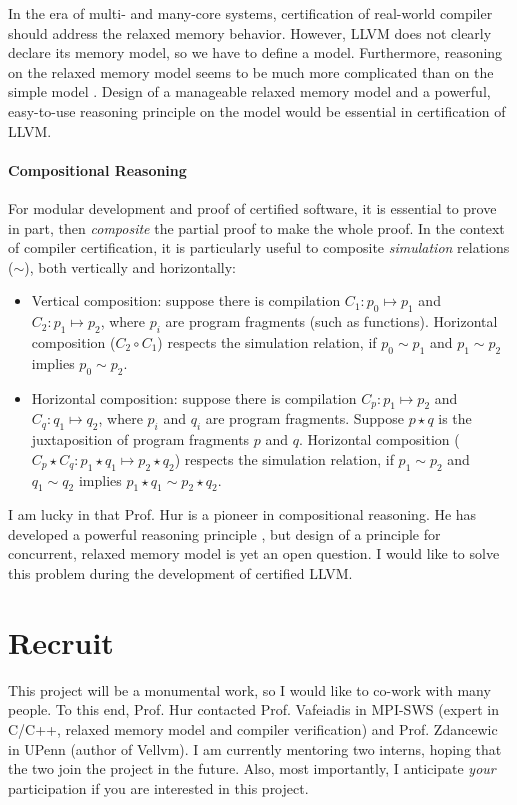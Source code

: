 \documentclass[nocopyrightspace]{sigplanconf}
\begin{document}
In the era of multi- and many-core systems, certification of
real-world compiler should address the relaxed memory behavior.
However, LLVM does not clearly declare its memory model, so we have to
define a model.  Furthermore, reasoning on the relaxed memory model
seems to be much more complicated than on the simple model
\cite{Aaron:GPS}.  Design of a manageable relaxed memory model and a
powerful, easy-to-use reasoning principle on the model would be
essential in certification of LLVM.

\paragraph{Compositional Reasoning}\label{sec:compose}

For modular development and proof of certified software, it is
essential to prove in part, then \emph{composite} the partial proof to
make the whole proof.  In the context of compiler certification, it is
particularly useful to composite \emph{simulation} relations ($\sim$),
both vertically and horizontally:
\begin{itemize}
\item Vertical composition: suppose there is compilation $C_1: p_0
  \mapsto p_1$ and $C_2: p_1 \mapsto p_2$, where $p_i$ are program
  fragments (such as functions).  Horizontal composition ($C_2 \circ
  C_1$) respects the simulation relation, if $p_0 \sim p_1$ and $p_1
  \sim p_2$ implies $p_0 \sim p_2$.
\item Horizontal composition: suppose there is compilation $C_p: p_1
  \mapsto p_2$ and $C_q: q_1 \mapsto q_2$, where $p_i$ and $q_i$ are
  program fragments.  Suppose $p \star q$ is the juxtaposition of
  program fragments $p$ and $q$.  Horizontal composition ($C_p \star
  C_q: p_1 \star q_1 \mapsto p_2 \star q_2$) respects the simulation
  relation, if $p_1 \sim p_2$ and $q_1 \sim q_2$ implies $p_1 \star
  q_1 \sim p_2 \star q_2$.
\end{itemize}

I am lucky in that Prof. Hur is a pioneer in compositional reasoning.
He has developed a powerful reasoning principle
\cite{Hur:2012:MBK:2103656.2103666}, but design of a principle for
concurrent, relaxed memory model is yet an open question.  I would
like to solve this problem during the development of certified LLVM.

\section{Recruit}
This project will be a monumental work, so I would like to co-work
with many people.  To this end, Prof. Hur contacted Prof. Vafeiadis in
MPI-SWS (expert in C/C++, relaxed memory model and compiler
verification) and Prof. Zdancewic in UPenn (author of Vellvm).  I am
currently mentoring two interns, hoping that the two join the project
in the future.  Also, most importantly, I anticipate \emph{your}
participation if you are interested in this project.






\end{document}
